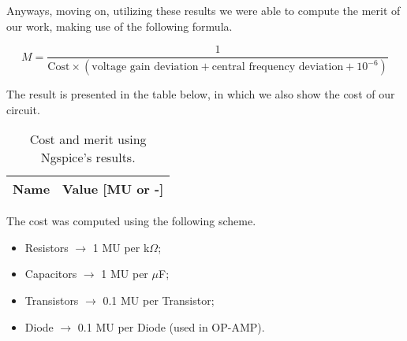Anyways, moving on, utilizing these results we were able to compute the merit of our work, making use of the following formula.

\begin{equation}
M = \frac{1}{\text{Cost}\times \left(\text{voltage gain deviation} + \text{central frequency deviation} + 10^{-6}\right)}
\end{equation}
\clearpage

The result is presented in the table below, in which we also show the cost of our circuit.

\begin{table}[h]
  \centering
  \begin{tabular}{|l|r|}
    \hline
    {\bf Name} & {\bf Value [MU or -]} \\ \hline
    
  \end{tabular}
  \caption{Cost and merit using Ngspice's results.}
  \label{tab:CostAndMerit}
\end{table}

The cost was computed using the following scheme.

\begin{itemize}
  \item Resistors $\rightarrow$ 1 MU per k$\Omega$;
  \item Capacitors $\rightarrow$ 1 MU per $\mu$F;
  \item Transistors $\rightarrow$ 0.1 MU per Transistor;
  \item Diode $\rightarrow$ 0.1 MU per Diode (used in OP-AMP).
\end{itemize}